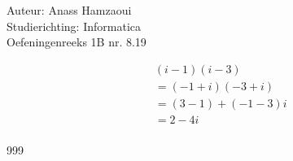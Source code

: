 \documentclass[a4paper]{article}
\begin{document}
  
\noindent \large Auteur: Anass Hamzaoui \\
\noindent \large Studierichting: Informatica\\
\noindent \large Oefeningenreeks 1B nr. 8.19\\  

\medskip

\normalsize

\begin{eqnarray*}
    && (i - 1)(i - 3) \\
    && = (-1 + i)(-3 + i) \\
    && = (3 - 1) + (-1 - 3)i \\
    && = 2 - 4i \\
\end{eqnarray*}

\begin{thebibliography}{999}
\end{thebibliography}
\end{document}

